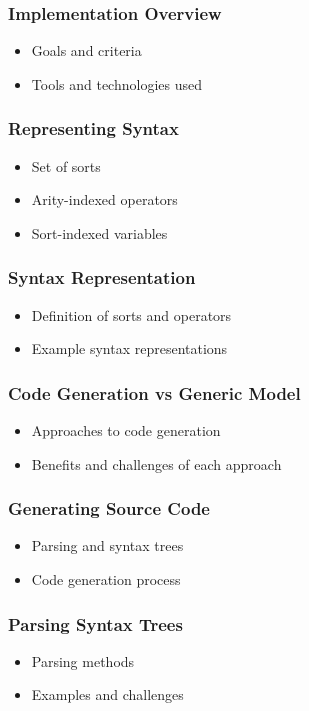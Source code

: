 \documentclass[t,24pt,aspectratio=169]{beamer}
\begin{document}
\begin{frame}[hvid]
    \frametitle{Implementation Overview}
    \begin{itemize}
        \item Goals and criteria
        \item Tools and technologies used
    \end{itemize}
\end{frame}

\begin{frame}[hvid]
    \frametitle{Representing Syntax}
    \begin{itemize}
        \item Set of sorts
        \item Arity-indexed operators
        \item Sort-indexed variables
    \end{itemize}
\end{frame}

\begin{frame}[hvid]
    \frametitle{Syntax Representation}
    \begin{itemize}
        \item Definition of sorts and operators
        \item Example syntax representations
    \end{itemize}
\end{frame}

\begin{frame}[hvid]
    \frametitle{Code Generation vs Generic Model}
    \begin{itemize}
        \item Approaches to code generation
        \item Benefits and challenges of each approach
    \end{itemize}
\end{frame}

\begin{frame}[hvid]
    \frametitle{Generating Source Code}
    \begin{itemize}
        \item Parsing and syntax trees
        \item Code generation process
    \end{itemize}
\end{frame}

\begin{frame}[hvid]
    \frametitle{Parsing Syntax Trees}
    \begin{itemize}
        \item Parsing methods
        \item Examples and challenges
    \end{itemize}
\end{frame}
\end{document}
